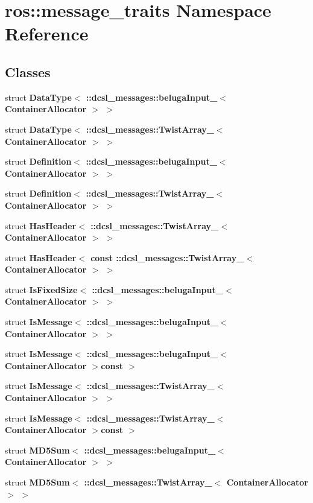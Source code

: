 \section{ros\-:\-:message\-\_\-traits \-Namespace \-Reference}
\label{namespaceros_1_1message__traits}
\subsection*{\-Classes}
\begin{DoxyCompactItemize}
\item 
struct {\bf \-Data\-Type$<$ \-::dcsl\-\_\-messages\-::beluga\-Input\-\_\-$<$ Container\-Allocator $>$ $>$}
\item 
struct {\bf \-Data\-Type$<$ \-::dcsl\-\_\-messages\-::\-Twist\-Array\-\_\-$<$ Container\-Allocator $>$ $>$}
\item 
struct {\bf \-Definition$<$ \-::dcsl\-\_\-messages\-::beluga\-Input\-\_\-$<$ Container\-Allocator $>$ $>$}
\item 
struct {\bf \-Definition$<$ \-::dcsl\-\_\-messages\-::\-Twist\-Array\-\_\-$<$ Container\-Allocator $>$ $>$}
\item 
struct {\bf \-Has\-Header$<$ \-::dcsl\-\_\-messages\-::\-Twist\-Array\-\_\-$<$ Container\-Allocator $>$ $>$}
\item 
struct {\bf \-Has\-Header$<$ const \-::dcsl\-\_\-messages\-::\-Twist\-Array\-\_\-$<$ Container\-Allocator $>$ $>$}
\item 
struct {\bf \-Is\-Fixed\-Size$<$ \-::dcsl\-\_\-messages\-::beluga\-Input\-\_\-$<$ Container\-Allocator $>$ $>$}
\item 
struct {\bf \-Is\-Message$<$ \-::dcsl\-\_\-messages\-::beluga\-Input\-\_\-$<$ Container\-Allocator $>$ $>$}
\item 
struct {\bf \-Is\-Message$<$ \-::dcsl\-\_\-messages\-::beluga\-Input\-\_\-$<$ Container\-Allocator $>$const  $>$}
\item 
struct {\bf \-Is\-Message$<$ \-::dcsl\-\_\-messages\-::\-Twist\-Array\-\_\-$<$ Container\-Allocator $>$ $>$}
\item 
struct {\bf \-Is\-Message$<$ \-::dcsl\-\_\-messages\-::\-Twist\-Array\-\_\-$<$ Container\-Allocator $>$const  $>$}
\item 
struct {\bf \-M\-D5\-Sum$<$ \-::dcsl\-\_\-messages\-::beluga\-Input\-\_\-$<$ Container\-Allocator $>$ $>$}
\item 
struct {\bf \-M\-D5\-Sum$<$ \-::dcsl\-\_\-messages\-::\-Twist\-Array\-\_\-$<$ Container\-Allocator $>$ $>$}
\end{DoxyCompactItemize}
